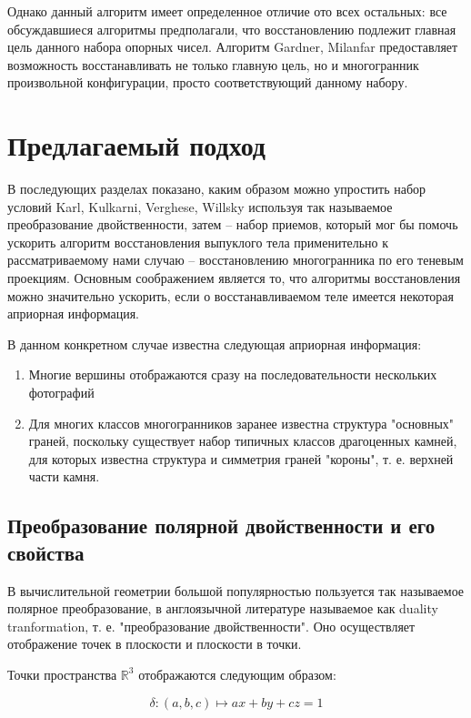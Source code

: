\documentclass[a4paper, 12pt, titlepage]{article}
\theoremstyle{definition}
\theoremstyle{plain}
\theoremstyle{plain}
\begin{document}
Однако данный алгоритм имеет определенное отличие ото всех остальных: все
обсуждавшиеся алгоритмы предполагали, что восстановлению подлежит главная 
цель данного набора опорных чисел. Алгоритм Gardner, Milanfar предоставляет 
возможность восстанавливать не только главную цель, но и многогранник 
произвольной конфигурации, просто соответствующий данному набору.

\newpage
\section{Предлагаемый подход}

В последующих разделах показано, каким образом можно упростить набор условий
Karl, Kulkarni, Verghese, Willsky используя так называемое преобразование
двойственности, затем -- набор приемов, который мог бы помочь ускорить алгоритм
восстановления выпуклого тела применительно к рассматриваемому нами случаю --
восстановлению многогранника по его теневым проекциям. Основным соображением
является то, что алгоритмы восстановления можно значительно ускорить, если о
восстанавливаемом теле имеется некоторая априорная информация.

В данном конкретном случае известна следующая априорная информация:

\begin{enumerate}
 \item Многие вершины отображаются сразу на последовательности нескольких
 фотографий
 \item Для многих классов многогранников заранее известна структура "основных"
 граней, поскольку существует набор типичных классов драгоценных камней, для
 которых известна структура и симметрия граней "короны", т. е. верхней части
 камня.
\end{enumerate}

\subsection{Преобразование полярной двойственности и его свойства}

В вычислительной геометрии большой популярностью пользуется так называемое
полярное преобразование, в англоязычной литературе называемое как duality
tranformation, т. е. "преобразование двойственности". Оно осуществляет
отображение точек в плоскости и плоскости в точки.

Точки пространства $\mathbb{R}^{3}$ отображаются следующим образом:

\begin{equation}
 \delta : (a, b, c) \longmapsto a x + b y + c z = 1
\end{equation}
\end{document}
